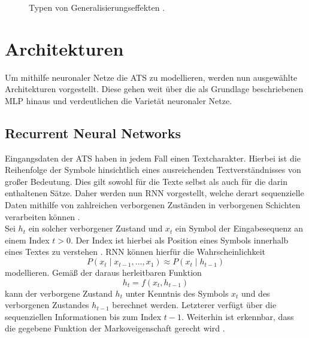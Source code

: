 \begin{figure}[h!]
  \centering
  \caption{Typen von Generalisierungseffekten \cite{EDPOJ}.}
  \label{pic:FittingTypes}
\end{figure}


\section{Architekturen}
\noindent
Um mithilfe neuronaler Netze die \ac{ATS} zu modellieren, werden nun ausgewählte Architekturen vorgestellt. Diese gehen weit über die als Grundlage beschriebenen \ac{MLP} hinaus und verdeutlichen die Varietät neuronaler Netze.


\subsection{Recurrent Neural Networks}
\noindent
Eingangsdaten der \ac{ATS} haben in jedem Fall einen Textcharakter. Hierbei ist die Reihenfolge der Symbole hinsichtlich eines ausreichenden Textverständnisses von großer Bedeutung. Dies gilt sowohl für die Texte selbst als auch für die darin enthaltenen Sätze. Daher werden nun \ac{RNN} vorgestellt, welche derart sequenzielle Daten mithilfe von zahlreichen verborgenen Zuständen in verborgenen Schichten verarbeiten können \cite[S.~301]{ZHA20}.\\

\noindent
Sei $h_t$ ein solcher verborgener Zustand und $x_t$ ein Symbol der Eingabesequenz an einem Index $t > 0$. Der Index ist hierbei als Position eines Symbols innerhalb eines Textes zu verstehen \cite{VAS17}. \ac{RNN} können hierfür die Wahrscheinlichkeit $$P(x_t \mid x_{t-1}, ... , x_1) \approx P(x_t \mid h_{t-1})$$ modellieren. Gemäß der daraus herleitbaren Funktion $$h_t = f(x_t, h_{t-1})$$ kann der verborgene Zustand $h_t$ unter Kenntnis des Symbols $x_t$ und des verborgenen Zustandes $h_{t-1}$ berechnet werden. Letzterer verfügt über die sequenziellen Informationen bis zum Index $t-1$. Weiterhin ist erkennbar, dass die gegebene Funktion der Markoveigenschaft gerecht wird \cite[S.~323-324]{ZHA20}.\\

